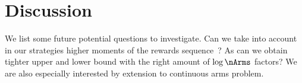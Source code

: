 \section{Discussion}\label{s:disc}
We list some future potential questions to 
investigate.
 Can we take into account in our 
strategies higher moments of the rewards 
sequence~\citep{Mnih08EB}? 
As \cite{Karnin13AO,Carpentier16TB} 
can we obtain tighter upper and lower bound with 
the right amount of $\log\nArms$ factors?
We are also especially interested by extension 
to continuous arms problem.